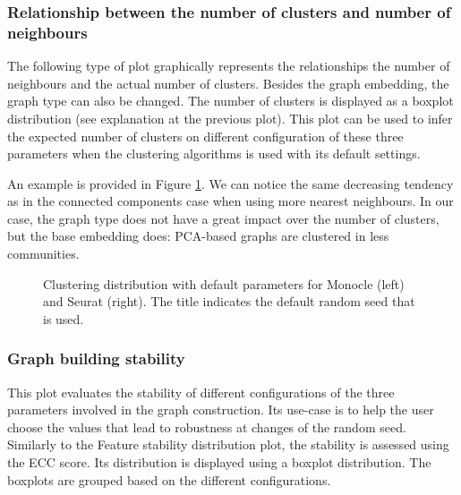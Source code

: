 \subsubsection{Relationship between the number of clusters and number of neighbours}
The following type of plot graphically represents the relationships the number of neighbours and the actual number of clusters. Besides the graph embedding, the graph type can also be changed. The number of clusters is displayed as a boxplot distribution (see explanation at the previous plot). This plot can be used to infer the expected number of clusters on different configuration of these three parameters when the clustering algorithms is used with its default settings.

An example is provided in Figure \ref{fig:ca-nn-k}. We can notice the same decreasing tendency as in the connected components case when using more nearest neighbours. In our case, the graph type does not have a great impact over the number of clusters, but the base embedding does: PCA-based graphs are clustered in less communities.

\begin{figure}[H]
    \centering
    \caption{\label{fig:ca-nn-k}Clustering distribution with default parameters for Monocle (left) and Seurat (right). The title indicates the default random seed that is used.}
\end{figure}

\subsubsection{Graph building stability}
This plot evaluates the stability of different configurations of the three parameters involved in the graph construction. Its use-case is to help the user choose the values that lead to robustness at changes of the random seed. Similarly to the Feature stability distribution plot, the stability is assessed using the ECC score. Its distribution is displayed using a boxplot distribution. The boxplots are grouped based on the different configurations.

